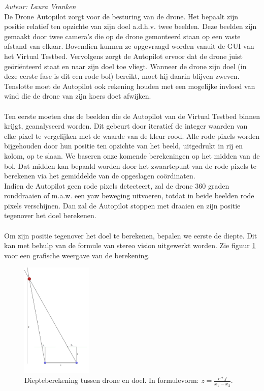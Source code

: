 {\em Auteur: Laura Vranken}\\

\noindent
De Drone Autopilot zorgt voor de besturing van de drone. Het bepaalt zijn positie relatief ten opzichte van zijn doel a.d.h.v. twee beelden. Deze beelden zijn gemaakt door twee camera's die op de drone gemonteerd staan op een vaste afstand van elkaar. Bovendien kunnen ze opgevraagd worden vanuit de GUI van het Virtual Testbed. Vervolgens zorgt de Autopilot ervoor dat de drone juist ge\"ori\"enteerd staat en naar zijn doel toe vliegt. Wanneer de drone zijn doel (in deze eerste fase is dit een rode bol) bereikt, moet hij daarin blijven zweven. Tenslotte moet de Autopilot ook rekening houden met een mogelijke invloed van wind die de drone van zijn koers doet afwijken.
\\
\\
Ten eerste moeten dus de beelden die de Autopilot van de Virtual Testbed binnen krijgt, geanalyseerd worden. Dit gebeurt door iteratief de integer waarden van elke pixel te vergelijken met de waarde van de kleur rood. Alle rode pixels worden bijgehouden door hun positie ten opzichte van het beeld, uitgedrukt in rij en kolom, op te slaan. We baseren onze komende berekeningen op het midden van de bol. Dat midden kan bepaald worden door het zwaartepunt van de rode pixels te berekenen via het gemiddelde van de opgeslagen co\"ordinaten.
\\
Indien de Autopilot geen rode pixels detecteert, zal de drone 360 graden ronddraaien of m.a.w. een yaw beweging uitvoeren, totdat in beide beelden rode pixels verschijnen. Dan zal de Autopilot stoppen met draaien en zijn positie tegenover het doel berekenen.
\\
\\
Om zijn positie tegenover het doel te berekenen, bepalen we eerste de diepte. Dit kan met behulp van de formule van stereo vision \cite{website:techbriefs} uitgewerkt worden. Zie figuur \ref{fig:DiepteberekeningDroneEnDoel} voor een grafische weergave van de berekening.
\begin{figure}[h]
	\centering
	\includegraphics[width=0.3\textwidth]{DiepteberekeningDroneEnDoel.png}
	\caption{Diepteberekening tussen drone en doel. In formulevorm: \(z = \frac{c * f}{x_1 - x_2}\).}
	\label{fig:DiepteberekeningDroneEnDoel}
\end{figure}
